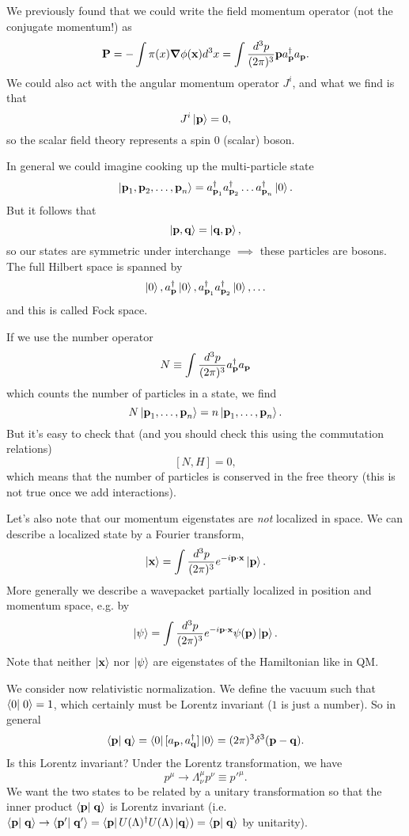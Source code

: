 We previously found that we could write the field momentum operator (not the conjugate momentum!) as
$$\boldsymbol{\mathbf{P}}=-\int \pi(x) \mbox{\boldmath$ \nabla $} \phi(\boldsymbol{\mathbf{x}}) d^3x = \int \frac{d^3p}{(2\pi)^3} \boldsymbol{\mathbf{ p}} a_{\boldsymbol{\mathbf{p}}}^\dagger a_{\boldsymbol{\mathbf{p}}}.$$
We could also act with the angular momentum operator $J^i$, and what we find is that 
$$J^i\left| \boldsymbol{\mathbf{p}} \right>=0,$$
so the scalar field theory represents a spin $0$ (scalar) boson.

In general we could imagine cooking up the multi-particle state
$$\left| \boldsymbol{\mathbf{p}}_1,\boldsymbol{\mathbf{p}}_2,\ldots,\boldsymbol{\mathbf{p}}_n \right>=a_{\boldsymbol{\mathbf{p}}_1}^\dagger a_{\boldsymbol{\mathbf{p}}_2}^\dagger \ldots a_{\boldsymbol{\mathbf{p}}_n}^\dagger \left| 0 \right>.$$
But it follows that
$$\left| \boldsymbol{\mathbf{p}}, \boldsymbol{\mathbf{q}} \right>=\left| \boldsymbol{\mathbf{q}},\boldsymbol{\mathbf{p}} \right>,$$
so our states are symmetric under interchange $\implies$ these particles are bosons. The full Hilbert space is spanned by
$$\left| 0 \right>,a_{\boldsymbol{\mathbf{p}}}^\dagger \left| 0 \right>, a_{\boldsymbol{\mathbf{p}}_1}^\dagger a_{\boldsymbol{\mathbf{p}}_2}^\dagger\left| 0 \right>, \ldots$$
and this is called Fock space.

If we use the number operator
$$N\equiv \int \frac{d^3p}{(2\pi)^3} a_{\boldsymbol{\mathbf{p}}}^\dagger a_{\boldsymbol{\mathbf{p}}}$$
which counts the number of particles in a state, we find
$$N\left| \boldsymbol{\mathbf{p}}_1, \ldots ,\boldsymbol{\mathbf{p}}_n \right>=n \left| \boldsymbol{\mathbf{p}}_1, \ldots ,\boldsymbol{\mathbf{p}}_n \right>.$$
But it's easy to check that (and you should check this using the commutation relations) $$[N,H]=0,$$
which means that the number of particles is conserved in the free theory (this is not true once we add interactions).

Let's also note that our momentum eigenstates are \emph{not} localized in space. We can describe a localized state by a Fourier transform,
$$\left| \boldsymbol{\mathbf{x}} \right> = \int \frac{d^3 p}{(2\pi)^3} e^{-i \boldsymbol{\mathbf{p}} \cdot \boldsymbol{\mathbf{x}}} \left| \boldsymbol{\mathbf{p}} \right>.$$
More generally we describe a wavepacket partially localized in position and momentum space, e.g. by 
$$\left| \psi \right> = \int\frac{d^3p}{(2\pi)^3} e^{-i\boldsymbol{\mathbf{p}} \cdot \boldsymbol{\mathbf{x}}} \psi(\boldsymbol{\mathbf{p}})\left| \boldsymbol{\mathbf{p}} \right>.$$
Note that neither $\left| \boldsymbol{\mathbf{x}} \right>$ nor $\left| \psi \right>$ are eigenstates of the Hamiltonian like in QM.

We consider now relativistic normalization. We define the vacuum such that $\braket{0}{0}=1$, which certainly must be Lorentz invariant ($1$ is just a number). So in general 
$$\braket{\vec p}{\vec q}=\bra{0}[a_{\pv},a_{\vec q}^\dagger] \ket{0}=(2\pi)^3 \delta^3(\vec p - \vec q).$$
Is this Lorentz invariant? Under the Lorentz transformation, we have $$p^\mu \to \Lambda^\mu_\nu p^\nu \equiv {p'}^\mu.$$
We want the two states to be related by a unitary transformation so that the inner product $\braket{\vec p}{\vec q}$ is Lorentz invariant (i.e. $\braket{\vec p}{\vec q}\to \braket{\vec p'}{\vec q'}=\bra{\pv}U(\Lambda)^\dagger U(\Lambda)\ket{\vec q})=\braket{\vec p}{\vec q}$ by unitarity).

